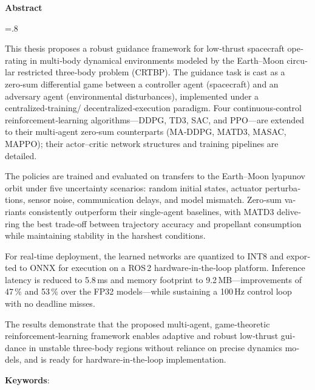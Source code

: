 


\pagestyle{empty}

\begin{latin}
	
	\begin{center}
		\textbf{Abstract}
	\end{center}
	\baselineskip=.8\baselineskip
	\noindent
	
This thesis proposes a robust guidance framework for low‑thrust spacecraft operating in multi‑body dynamical environments modeled by the Earth–Moon circular restricted three‑body problem (CRTBP). The guidance task is cast as a zero‑sum differential game between a controller agent (spacecraft) and an adversary agent (environmental disturbances), implemented under a centralized‑training/ decentralized‑execution paradigm. Four continuous‑control reinforcement‑learning algorithms—DDPG, TD3, SAC, and PPO—are extended to their multi‑agent zero‑sum counterparts (MA‑DDPG, MATD3, MASAC, MAPPO); their actor–critic network structures and training pipelines are detailed.

The policies are trained and evaluated on transfers to the Earth–Moon  lyapunov orbit under five uncertainty scenarios: random initial states, actuator perturbations, sensor noise, communication delays, and model mismatch. Zero‑sum variants consistently outperform their single‑agent baselines, with MATD3 delivering the best trade‑off between trajectory accuracy and propellant consumption while maintaining stability in the harshest conditions.

For real‑time deployment, the learned networks are quantized to INT8 and exported to ONNX for execution on a ROS 2 hardware‑in‑the‑loop platform. Inference latency is reduced to 5.8 ms and memory footprint to 9.2 MB—improvements of 47 \% and 53 \% over the FP32 models—while sustaining a 100 Hz control loop with no deadline misses.

The results demonstrate that the proposed multi‑agent, game‑theoretic reinforcement‑learning framework enables adaptive and robust low‑thrust guidance in unstable three‑body regions without reliance on precise dynamics models, and is ready for hardware‑in‑the‑loop implementation.

	
	\bigskip\noindent\textbf{Keywords}:
	
\end{latin}

\newpage